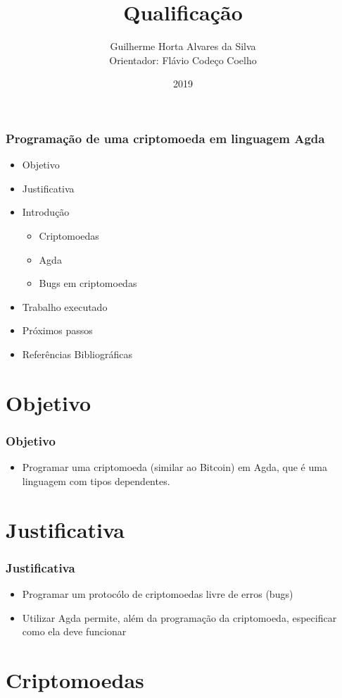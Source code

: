 \documentclass{beamer}
\title{Qualificação}
\author[Guilherme, Flávio]{Guilherme Horta Alvares da Silva \\
  Orientador: Flávio Codeço Coelho}
\institute{Fundação Getulio Vargas}
\date{2019}
\begin{document}
 
\frame{\titlepage}

\begin{frame}
  \frametitle{Programação de uma criptomoeda em linguagem Agda}
\begin{itemize}
  \item Objetivo
  \item Justificativa
  \item Introdução
  \begin{itemize}
    \item Criptomoedas
    \item Agda
    \item Bugs em criptomoedas
  \end{itemize}
  \item Trabalho executado
  \item Próximos passos
  \item Referências Bibliográficas
\end{itemize}
\end{frame}

\section{Objetivo}

 \begin{frame}
\frametitle{Objetivo}
\begin{itemize}
  \item Programar uma criptomoeda (similar ao Bitcoin) em Agda, que é uma linguagem com tipos dependentes.
\end{itemize}
\end{frame}
 
\section{Justificativa}

 \begin{frame}
\frametitle{Justificativa}
\begin{itemize}
    \item Programar um protocólo de criptomoedas livre de erros (bugs)
    \item Utilizar Agda permite, além da programação da criptomoeda, especificar como ela deve funcionar
      \cite{norell2008dependently}
\end{itemize}
\end{frame}

\section{Criptomoedas}
\end{document}
